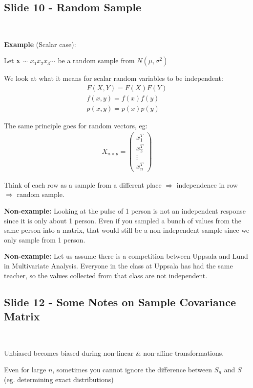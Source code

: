 \subsection{Slide 10 - Random Sample}\hfill\\
\par\bigskip
\noindent \textbf{Example} (Scalar case):\par
\noindent Let \textbf{x} $\sim$ \textbf{$x_1 x_2 x_3 \cdots$} be a random sample from $N(\mu,\sigma^2)$
\par\bigskip
\noindent We look at what it means for scalar random variables to be independent:
\begin{equation*}
  \begin{gathered}
    F(X,Y) = F(X)F(Y)\\
    f(x,y) = f(x)f(y)\\
    p(x,y) = p(x)p(y)
  \end{gathered}
\end{equation*}
\par\bigskip
\noindent The same principle goes for random vectors, eg:
\begin{equation*}
  \begin{gathered}
    X_{n\times p} = \begin{pmatrix}x_1^T\\x_2^T\\\vdots\\x_n^T\end{pmatrix}
  \end{gathered}
\end{equation*}
\par\bigskip
\noindent Think of each row as a sample from a different place $\Rightarrow$ independence in row $\Rightarrow$ random sample.
\par\bigskip
\noindent\textbf{Non-example:} Looking at the pulse of 1 person is not an independent response since it is only about 1 person. Even if you sampled a bunch of values from the same person into a matrix, that would still be a non-independent sample since we only sample from 1 person.
\par\bigskip
\noindent\textbf{Non-example:} Let us assume there is a competition between Uppsala and Lund in Multivariate Analysis. Everyone in the class at Uppsala has had the same teacher, so the values collected from that class are not independent.
\par\bigskip
\subsection{Slide 12 - Some Notes on Sample Covariance Matrix}\hfill\\
\par\bigskip
\noindent Unbiased becomes biased during non-linear \& non-affine transformations.
\par\bigskip
\noindent Even for large $n$, sometimes you cannot ignore the difference between $S_n$ and $S$ (eg. determining exact distributions)
\par\bigskip
